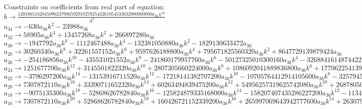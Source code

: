 \documentclass[12pt,a4paper,draft]{article}
\begin{document}
Constraints on coefficients from real part of equation:
\\$b\to \frac{12018651620450962379065929102782543261054533632000000000 a_{36} \chi ^{18}}{A^2}$\\
$a_{34}\to -630 a_{36} k^2-23988 a_{36}$\\
$a_{32}\to 58905 a_{36} k^4+13457268 a_{36} k^2+266897280 a_{36}$\\
$a_{30}\to -1947792 a_{36} k^6-1112467488 a_{36} k^4-132381050880 a_{36} k^2-1829130633472 a_{36}$\\
$a_{28}\to 30260340 a_{36} k^8+32261557152 a_{36} k^6+9597626188800 a_{36} k^4+795671825560320 a_{36} k^2+8647729139879424 a_{36}$\\
$a_{26}\to -254186856 a_{36} k^{10}-435531021552 a_{36} k^8-241860179957760 a_{36} k^6-50127325010300160 a_{36} k^4-3268841614874422272 a_{36} k^2-29933436081188689920 a_{36}$\\
$a_{24}\to 1251677700 a_{36} k^{12}+3145501822320 a_{36} k^{10}+2807305660224000 a_{36} k^8+1086092041889836800 a_{36} k^6+177062254139031206400 a_{36} k^4+9728366726386324224000 a_{36} k^2+78569552955302676971520 a_{36}$\\
$a_{22}\to -3796297200 a_{36} k^{14}-13153916711520 a_{36} k^{12}-17218141382707200 a_{36} k^{10}-10705764412914105600 a_{36} k^8-3257945476158174197760 a_{36} k^6-447504869413770914304000 a_{36} k^4-21685196615663538844139520 a_{36} k^2-159802585247117252622090240 a_{36}$\\
$a_{20}\to 7307872110 a_{36} k^{16}+33390711652320 a_{36} k^{14}+60263494839475200 a_{36} k^{12}+54956257319625742080 a_{36} k^{10}+26878050178304937131520 a_{36} k^8+6891574988972072080281600 a_{36} k^6+834880069703046245499371520 a_{36} k^4+36914397192084085355702845440 a_{36} k^2+255151504031008726016088145920 a_{36}$\\
$a_{18}\to -9075135300 a_{36} k^{18}-52868626782840 a_{36} k^{16}-125824879335168000 a_{36} k^{14}-158207407435286227200 a_{36} k^{12}-113485100752843067888640 a_{36} k^{10}-46764258853739060544768000 a_{36} k^8-10575147549571919109658705920 a_{36} k^6-1168955911082662702930590105600 a_{36} k^4-48478785765891657943056747724800 a_{36} k^2-321996120642301728180129078968320 a_{36}$\\
$a_{16}\to 7307872110 a_{36} k^{20}+52868626782840 a_{36} k^{18}+160426721152339200 a_{36} k^{16}+265997069643942777600 a_{36} k^{14}+263079097199772566469120 a_{36} k^{12}+158998480102712805852211200 a_{36} k^{10}+57785627681589415134920785920 a_{36} k^8+11923350293043159569892019077120 a_{36} k^6+1236209037030237277547947066982400 a_{36} k^4+49265406458272164411559749082152960 a_{36} k^2+321724106696202377965158439304822784 a_{36}$\\
\end{document}
